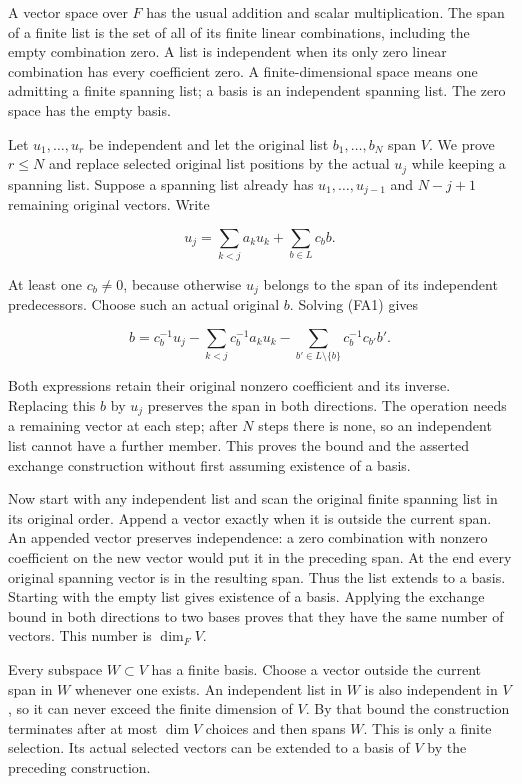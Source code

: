 \documentclass[
  11pt,
]{article}
\begin{document}
A vector space over \(F\) has the usual addition and scalar
multiplication. The span of a finite list is the set of all of its
finite linear combinations, including the empty combination zero. A list
is independent when its only zero linear combination has every
coefficient zero. A finite-dimensional space means one admitting a
finite spanning list; a basis is an independent spanning list. The zero
space has the empty basis.

Let \(u_1,\ldots,u_r\) be independent and let the original list
\(b_1,\ldots,b_N\) span \(V\). We prove \(r\leq N\) and replace selected
original list positions by the actual \(u_j\) while keeping a spanning
list. Suppose a spanning list already has \(u_1,\ldots,u_{j-1}\) and
\(N-j+1\) remaining original vectors. Write

\[
u_j=\sum_{k<j}a_k u_k+\sum_{b\in L}c_b b.
\tag{FA1}
\]

At least one \(c_b\ne0\), because otherwise \(u_j\) belongs to the span
of its independent predecessors. Choose such an actual original \(b\).
Solving (FA1) gives

\[
b=c_b^{-1}u_j-\sum_{k<j}c_b^{-1}a_k u_k
 -\sum_{b'\in L\setminus\{b\}}c_b^{-1}c_{b'}b'.
\tag{FA2}
\]

Both expressions retain their original nonzero coefficient and its
inverse. Replacing this \(b\) by \(u_j\) preserves the span in both
directions. The operation needs a remaining vector at each step; after
\(N\) steps there is none, so an independent list cannot have a further
member. This proves the bound and the asserted exchange construction
without first assuming existence of a basis.

Now start with any independent list and scan the original finite
spanning list in its original order. Append a vector exactly when it is
outside the current span. An appended vector preserves independence: a
zero combination with nonzero coefficient on the new vector would put it
in the preceding span. At the end every original spanning vector is in
the resulting span. Thus the list extends to a basis. Starting with the
empty list gives existence of a basis. Applying the exchange bound in
both directions to two bases proves that they have the same number of
vectors. This number is \(\dim_F V\).

Every subspace \(W\subset V\) has a finite basis. Choose a vector
outside the current span in \(W\) whenever one exists. An independent
list in \(W\) is also independent in \(V\), so it can never exceed the
finite dimension of \(V\). By that bound the construction terminates
after at most \(\dim V\) choices and then spans \(W\). This is only a
finite selection. Its actual selected vectors can be extended to a basis
of \(V\) by the preceding construction.
\end{document}
